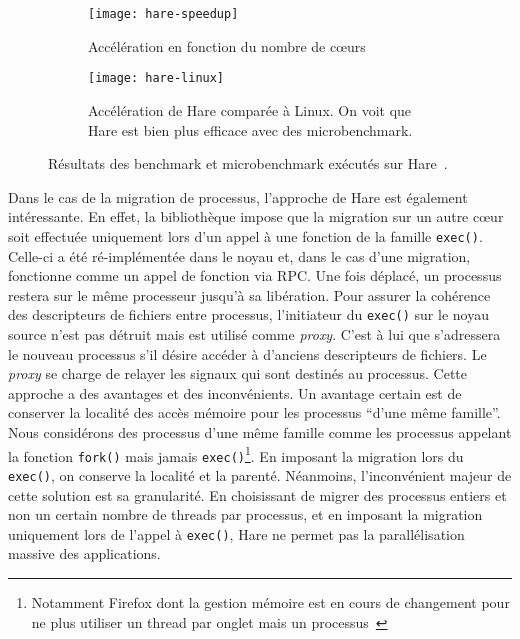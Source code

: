       \begin{figure}[ht]
        \begin{subfigure}[b]{0.5\textwidth}
          \texttt{[image: hare-speedup]}
          \caption{Accélération en fonction du nombre de c\oe urs}
        \end{subfigure}
        \begin{subfigure}[b]{0.5\textwidth}
          \texttt{[image: hare-linux]}
          \caption{Accélération de Hare comparée à Linux. On voit que Hare est
            bien plus efficace avec des microbenchmark.}
        \end{subfigure}
        \caption{Résultats des benchmark et microbenchmark exécutés sur
          Hare~\citep{gruenwald2014providing}.}
        \label{fig:hare-res}
      \end{figure}

      Dans le cas de la migration de processus, l'approche de Hare est également
      intéressante. En effet, la bibliothèque impose que la migration sur un
      autre c\oe ur soit effectuée uniquement lors d'un appel à une fonction de
      la famille \texttt{exec()}. Celle-ci a été ré-implémentée dans le noyau
      et, dans le cas d'une migration, fonctionne comme un appel de fonction via
      RPC. Une fois déplacé, un
      processus restera sur le même processeur jusqu'à sa libération. Pour
      assurer la cohérence des descripteurs de fichiers entre processus,
      l'initiateur du \texttt{exec()} sur le noyau source n'est pas détruit mais
      est utilisé comme \textit{proxy}. C'est à lui que s'adressera le nouveau
      processus s'il désire accéder à d'anciens descripteurs de fichiers. Le
      \textit{proxy} se charge de relayer les signaux qui sont destinés au
      processus.
      \enlargethispage{1mm} %
      Cette approche a des avantages et des inconvénients. Un avantage certain
      est de conserver la localité des accès mémoire pour les processus ``d'une
      même famille''. Nous considérons des processus d'une même famille comme
      les processus appelant la fonction \texttt{fork()} mais jamais
      \texttt{exec()}\footnote{Notamment Firefox dont la gestion mémoire est en
        cours de changement pour ne plus utiliser un thread par onglet mais un
        processus~\citep{mozillaElectrolysis}}. En imposant la migration lors du
      \texttt{exec()}, on conserve la localité et la parenté. Néanmoins,
      l'inconvénient majeur de cette solution est sa granularité. En choisissant
      de migrer des processus entiers et non un certain nombre de threads par
      processus, et en imposant la migration uniquement lors de l'appel à
      \texttt{exec()}, Hare ne permet pas la parallélisation massive des
      applications.


